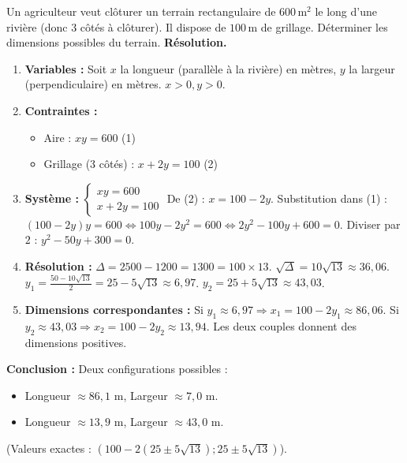 \documentclass[11pt]{article}
\begin{document}
\begin{exoresolu}
    Un agriculteur veut clôturer un terrain rectangulaire de $600\,\text{m}^2$ le long d'une rivière (donc 3 côtés à clôturer). Il dispose de $100\,\text{m}$ de grillage.
    Déterminer les dimensions possibles du terrain.
    \tcblower
    \textbf{Résolution.}
    \begin{enumerate}
        \item \textbf{Variables :} Soit $x$ la longueur (parallèle à la rivière) en mètres, $y$ la largeur (perpendiculaire) en mètres. $x>0, y>0$.
        \item \textbf{Contraintes :}
        \begin{itemize}
            \item Aire : $xy = 600$ \quad (1)
            \item Grillage (3 côtés) : $x + 2y = 100$ \quad (2)
        \end{itemize}
        \item \textbf{Système :} $\begin{cases} xy=600 \\ x+2y=100 \end{cases}$
        De (2) : $x = 100-2y$.
        Substitution dans (1) : $(100-2y)y = 600 \iff 100y-2y^2=600 \iff 2y^2-100y+600=0$.
        Diviser par $2$ : $y^2-50y+300=0$.
        \item \textbf{Résolution :} $\Delta = 2500 - 1200 = 1300 = 100 \times 13$. $\sqrt{\Delta}=10\sqrt{13} \approx 36,06$.
        $y_1 = \frac{50-10\sqrt{13}}{2} = 25-5\sqrt{13} \approx 6,97$.
        $y_2 = 25+5\sqrt{13} \approx 43,03$.
        \item \textbf{Dimensions correspondantes :}
        Si $y_1 \approx 6,97 \Rightarrow x_1 = 100-2y_1 \approx 86,06$.
        Si $y_2 \approx 43,03 \Rightarrow x_2 = 100-2y_2 \approx 13,94$.
        Les deux couples donnent des dimensions positives.
    \end{enumerate}
    \textbf{Conclusion :} Deux configurations possibles :
    \begin{itemize}
        \item Longueur $\approx 86,1$ m, Largeur $\approx 7,0$ m.
        \item Longueur $\approx 13,9$ m, Largeur $\approx 43,0$ m.
    \end{itemize}
    (Valeurs exactes : $(100-2(25\pm5\sqrt{13}); 25\pm5\sqrt{13})$).
\end{exoresolu}
\end{document}

